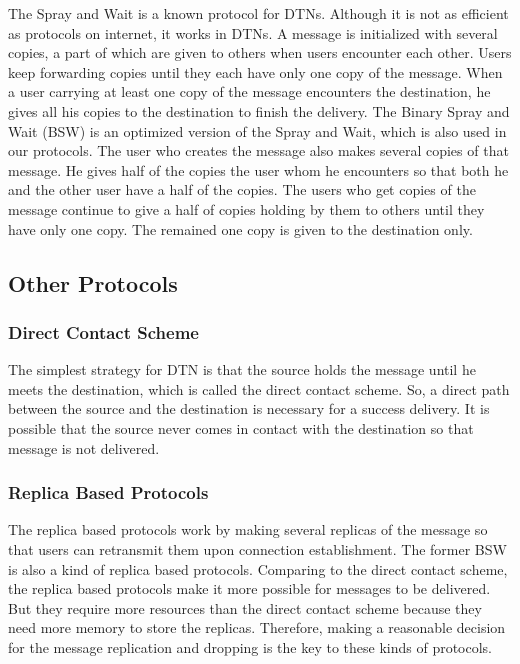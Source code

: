 \noindent The Spray and Wait is a known protocol for DTNs. Although it is not as efficient as protocols on internet, it works in DTNs. A message is initialized with several copies, a part of which are given to others when users encounter each other. Users keep forwarding copies until they each have only one copy of the message. When a user carrying at least one copy of the message encounters the destination, he gives all his copies to the destination to finish the delivery. The Binary Spray and Wait (BSW) is an optimized version of the Spray and Wait, which is also used in our protocols. The user who creates the message also makes several copies of that message. He gives half of the copies the user whom he encounters so that both he and the other user have a half of the copies. The users who get copies of the message continue to give a half of copies holding by them to others until they have only one copy. The remained one copy is given to the destination only.

\subsection{ Other Protocols}


\subsubsection{ Direct Contact Scheme}

\noindent The simplest strategy for DTN is that the source holds the message until he meets the destination, which is called the direct contact scheme. So, a direct path between the source and the destination is necessary for a success delivery. It is possible that the source never comes in contact with the destination so that message is not delivered. 


\subsubsection{ Replica Based Protocols}

\noindent The replica based protocols work by making several replicas of the message so that users can retransmit them upon connection establishment. The former BSW is also a kind of replica based protocols. Comparing to the direct contact scheme, the replica based protocols make it more possible for messages to be delivered. But they require more resources than the direct contact scheme because they need more memory to store the replicas. Therefore, making a reasonable decision for the message replication and dropping is the key to these kinds of protocols.


